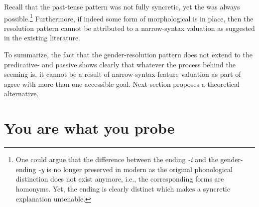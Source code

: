 \documentclass[output=paper,modfontsnewtxmath,hidelinks]{langscibook}
\begin{document}
\ea\label{gaps}
\smallskip
{}
\z\z

\noindent Recall that the past-tense pattern was not fully syncretic, yet the  was always possible.\footnote{One could argue that the difference between the  ending \textit{-i} and the gender- ending \textit{-y} is no longer preserved in modern  as the original phonological distinction does not exist anymore, i.e., the corresponding  forms are homonyms. Yet, the   ending is clearly distinct which makes a syncretic explanation untenable.}
 Furthermore, if indeed some form of morphological  is in place, then the resolution pattern cannot be attributed to a narrow-syntax valuation as suggested in the existing literature. 
 
To summarize, the fact that the gender-resolution pattern does not extend to the predicative- and passive  shows clearly that whatever the process behind the seeming  is, it cannot be a result of narrow-syntax-feature valuation as part of agree with more than one accessible goal. Next section proposes a theoretical alternative.


\section{You are what you probe}
\end{document}

